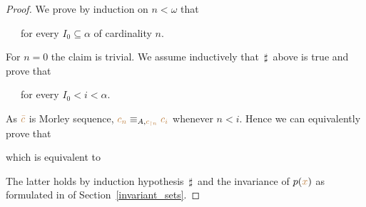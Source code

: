 \begin{proof}


We prove by induction on $n<\omega$ that

\ \ \ for every $I_0\subseteq\alpha$ of cardinality $n$.

For $n=0$ the claim is trivial.
We assume inductively that $\,\sharp\,$ above is true and prove that

\ \ \ for every $I_0<i<\alpha$.

As ${\color{brown}\bar c}$ is  Morley sequence, ${\color{brown} c_n}\equiv_{A,{\color{brown} c_{\restriction n}}} {\color{brown} c_i}$ whenever $n<i$.
Hence we can equivalently prove that


which is equivalent to


The latter holds by induction hypothesis $\,\sharp\,$ and the invariance of $p({\color{brown} x})$ as formulated in  of Section~\ref{invariant_sets}.
\end{proof}






